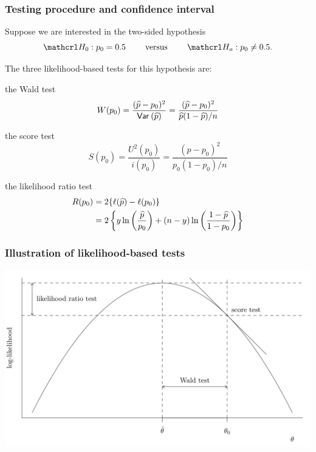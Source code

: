 \documentclass{beamer}
\begin{document}
\begin{frame}
 \frametitle{Testing procedure and confidence interval}
 Suppose we are interested in the two-sided hypothesis 
 \[\Hy_0: p_0 = 0.5 \qquad \text{ versus } \qquad \Hy_a: p_0 \neq 0.5.\]
 
 The three likelihood-based tests for this hypothesis are:
 \bi \item 
 the Wald test 
  \[W(p_0) = \frac{(\widehat{p} - p_0)^2}{{\mathsf{Var}_{}}\left(\widehat{p}\right)} = \frac{(\widehat{p}-p_0)^2}{\widehat{p}(1-\widehat{p})/n}\]
  \item  the score test 
  \[S(p_0) = \frac{U^2(p_0)}{i(p_0)} = \frac{(\widehat{p}-p_0)^2}{p_0(1-p_0)/n}\]
 \item the likelihood ratio test
 \begin{align*}
  R(p_0) &= 2\{\ell(\widehat{p}) - \ell(p_0)\} 
  \\&= 2 \left\{ y\ln \left(\frac{\widehat{p}}{p_0}\right) + (n-y)\ln\left(\frac{1-\widehat{p}}{1-p_0}\right)\right\}
 \end{align*}
\ei
 \end{frame}
  \begin{frame}
 \frametitle{Illustration of likelihood-based tests}
 \begin{center}
  \includegraphics[width = \linewidth]{img/c3/likelihood_tests}
 \end{center}
\end{frame}
\end{document}
